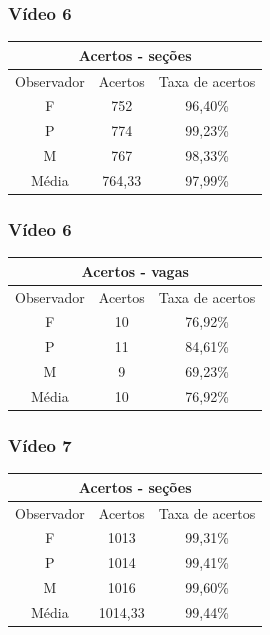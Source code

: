 \documentclass{beamer}
\begin{document}
\begin{frame}
	\frametitle{Vídeo 6}
\begin{center}
\begin{tabular}{|c||c||c|}
\hline
\multicolumn{3}{|c|}{Acertos - seções}  \\ \hline
Observador & Acertos & Taxa de acertos \\ \hline
F & 752 & 96,40\% \\  \hline
P & 774 & 99,23\% \\ \hline
M & 767 & 98,33\% \\ \hline
Média & 764,33 & 97,99\% \\
\hline
\end{tabular}
\end{center}
\end{frame}

\begin{frame}
\frametitle{Vídeo 6}

\begin{center}
\begin{tabular}{|c||c||c|}
\hline
\multicolumn{3}{|c|}{Acertos - vagas}  \\ \hline \hline
Observador & Acertos & Taxa de acertos \\ \hline
F & 10 & 76,92\% \\  \hline
P & 11 & 84,61\% \\ \hline
M & 9 & 69,23\% \\ \hline
Média & 10 & 76,92\% \\
\hline
\end{tabular}
\end{center}
\end{frame}



\begin{frame}
	\frametitle{Vídeo 7}
\begin{center}
\begin{tabular}{|c||c||c|}
\hline
\multicolumn{3}{|c|}{Acertos - seções}  \\ \hline
Observador & Acertos & Taxa de acertos \\ \hline
F & 1013 & 99,31\% \\  \hline
P & 1014 & 99,41\% \\ \hline
M & 1016 & 99,60\% \\ \hline
Média & 1014,33 & 99,44\% \\
\hline
\end{tabular}
\end{center}
\end{frame}
\end{document}
